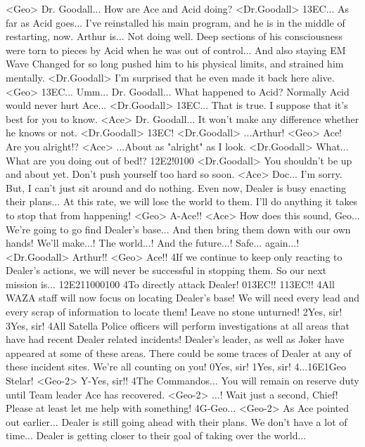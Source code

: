 <Geo> Dr. Goodall... 
How are Ace and Acid doing? 
<Dr.Goodall> {13}{EC}... 
As far as Acid goes... 
I've reinstalled his main program, and he is in the middle of restarting, now. 
Arthur is... 
Not doing well. 
Deep sections of his consciousness were torn to 
pieces by Acid when he was out of control... 
And also staying EM Wave Changed for so long pushed 
him to his physical limits, and strained him mentally. 
<Dr.Goodall> I'm surprised that he even made it back here alive. 
<Geo> {13}{EC}... 
Umm... Dr. Goodall... 
What happened to Acid? 
Normally Acid would never hurt Ace... 
<Dr.Goodall> {13}{EC}... 
That is true. 
I suppose that it's best for you to know. 
<Ace> Dr. Goodall... 
It won't make any difference whether he knows or not. 
<Dr.Goodall> {13}{EC}! 
<Dr.Goodall> ...Arthur! 
<Geo> Ace! 
Are you alright!? 
<Ace> ...About as "alright" as I look. 
<Dr.Goodall> What... 
What are you doing out of bed!? 
{12}{E2}!{01}{00} 
<Dr.Goodall> You shouldn't be up and about yet. 
Don't push yourself too hard so soon. 
<Ace> Doc... I'm sorry. 
But, I can't just sit around and do nothing. 
Even now, Dealer is busy enacting their plans... 
At this rate, we will lose the world to them. 
I'll do anything it takes to stop that from happening! 
<Geo> A-Ace!! 
<Ace> How does this sound, Geo... 
We're going to go find Dealer's base... 
And then bring them down with our own hands! 
We'll make...! 
The world...! 
And the future...! Safe... again...! 
<Dr.Goodall> Arthur!! 
<Geo> Ace!! 
4If we continue to keep only reacting to Dealer's 
actions, we will never be successful in stopping them. 
So our next mission is... 
{12}{E2}{11}{00}{01}{00} 
4To directly attack Dealer! 
0{13}{EC}!! 
1{13}{EC}!! 
4All WAZA staff will now focus on locating Dealer's base! 
We will need every lead and every scrap of information to locate them! 
Leave no stone unturned! 
2Yes, sir! 
3Yes, sir! 
4All Satella Police officers will perform investigations at all 
areas that have had recent Dealer related incidents! 
Dealer's leader, as well as Joker have appeared at some of these areas. 
There could be some traces of Dealer at any of these incident sites. 
We're all counting on you! 
0Yes, sir! 
1Yes, sir! 
4...{16}{E1}Geo Stelar! 
<Geo-2> Y-Yes, sir!! 
4The Commandos... 
You will remain on reserve duty until Team leader Ace has recovered. 
<Geo-2> ...! 
Wait just a second, Chief! 
Please at least let me help with something! 
4G-Geo... 
<Geo-2> As Ace pointed out earlier... Dealer is still going ahead with their plans. 
We don't have a lot of time... 
Dealer is getting closer to their goal of taking over the world... 
